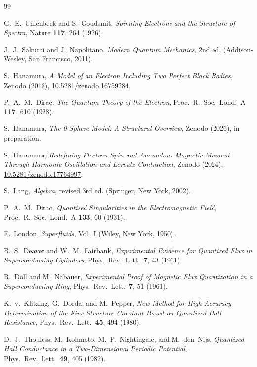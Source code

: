 \documentclass[%
 reprint, amsmath,amssymb, aps, prb, ]{revtex4-2}
\numberwithin{equation}{section}
\begin{document}
\clearpage
\begin{thebibliography}{99}

G.~E.~Uhlenbeck and S.~Goudsmit,
\emph{Spinning Electrons and the Structure of Spectra},
Nature \textbf{117}, 264 (1926).

J.~J.~Sakurai and J.~Napolitano,
\emph{Modern Quantum Mechanics}, 2nd ed.
(Addison-Wesley, San Francisco, 2011).

S.~Hanamura,
\emph{A Model of an Electron Including Two Perfect Black Bodies},
Zenodo (2018), \href{https://doi.org/10.5281/zenodo.16759284}{10.5281/zenodo.16759284}.

P.~A.~M.~Dirac,
\emph{The Quantum Theory of the Electron},
Proc.~R.~Soc.~Lond.~A \textbf{117}, 610 (1928).

S.~Hanamura,
\emph{The 0-Sphere Model: A Structural Overview},
Zenodo (2026), in preparation.

S.~Hanamura,
\emph{Redefining Electron Spin and Anomalous Magnetic Moment Through Harmonic Oscillation and Lorentz Contraction},
Zenodo (2024), \href{https://doi.org/10.5281/zenodo.17764997}{10.5281/zenodo.17764997}.

S.~Lang,
\emph{Algebra}, revised 3rd ed.
(Springer, New York, 2002).

P.~A.~M.~Dirac,
\emph{Quantised Singularities in the Electromagnetic Field},
Proc.~R.~Soc.~Lond.~A \textbf{133}, 60 (1931).

F.~London,
\emph{Superfluids}, Vol.~I
(Wiley, New York, 1950).

B.~S.~Deaver and W.~M.~Fairbank,
\emph{Experimental Evidence for Quantized Flux in Superconducting Cylinders},
Phys.~Rev.~Lett.\ \textbf{7}, 43 (1961).

R.~Doll and M.~N\"abauer,
\emph{Experimental Proof of Magnetic Flux Quantization in a Superconducting Ring},
Phys.~Rev.~Lett.\ \textbf{7}, 51 (1961).

K.~v.~Klitzing, G.~Dorda, and M.~Pepper,
\emph{New Method for High-Accuracy Determination of the Fine-Structure Constant Based on Quantized Hall Resistance},
Phys.~Rev.~Lett.\ \textbf{45}, 494 (1980).

D.~J.~Thouless, M.~Kohmoto, M.~P.~Nightingale, and M.~den~Nijs,
\emph{Quantized Hall Conductance in a Two-Dimensional Periodic Potential},
Phys.~Rev.~Lett.\ \textbf{49}, 405 (1982).


\end{thebibliography}
\end{document}
